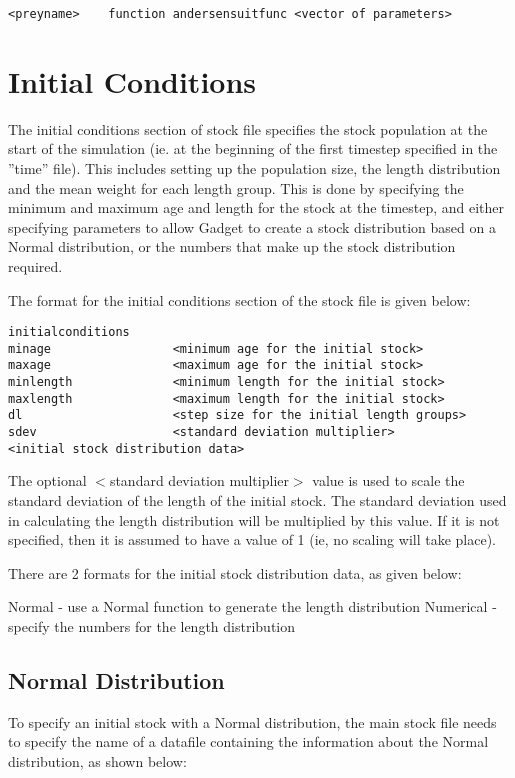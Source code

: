 \documentclass [a4paper, 10pt]{book}
\begin{document}
{\small\begin{verbatim}
<preyname>    function andersensuitfunc <vector of parameters>
\end{verbatim}}

\section{Initial Conditions}\label{subsec:stockinitial}
The initial conditions section of stock file specifies the stock population at the start of the simulation (ie. at the beginning of the first timestep specified in the ''time'' file).  This includes setting up the population size, the length distribution and the mean weight for each length group.  This is done by specifying the minimum and maximum age and length for the stock at the timestep, and either specifying parameters to allow Gadget to create a stock distribution based on a Normal distribution, or the numbers that make up the stock distribution required.

\bigskip
The format for the initial conditions section of the stock file is given below:

{\small\begin{verbatim}
initialconditions
minage                 <minimum age for the initial stock>
maxage                 <maximum age for the initial stock>
minlength              <minimum length for the initial stock>
maxlength              <maximum length for the initial stock>
dl                     <step size for the initial length groups>
sdev                   <standard deviation multiplier>
<initial stock distribution data>
\end{verbatim}}

The optional $<$standard deviation multiplier$>$ value is used to scale the standard deviation of the length of the initial stock.  The standard deviation used in calculating the length distribution will be multiplied by this value.  If it is not specified, then it is assumed to have a value of 1 (ie, no scaling will take place).

\bigskip
There are 2 formats for the initial stock distribution data, as given below:

\bigskip
Normal - use a Normal function to generate the length distribution\newline
Numerical - specify the numbers for the length distribution

\subsection{Normal Distribution}
To specify an initial stock with a Normal distribution, the main stock file needs to specify the name of a datafile containing the information about the Normal distribution, as shown below:
\end{document}
